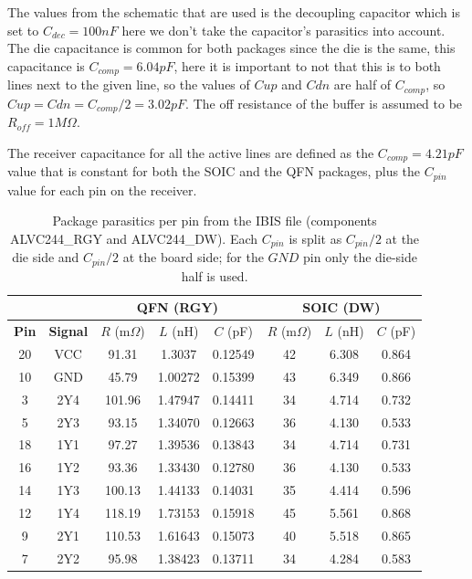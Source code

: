 The values from the schematic that are used is the decoupling capacitor which is set to $C_{dec}=100nF$ here we don't take the capacitor's parasitics into account. The die capacitance is common for both packages since the die is the same, this capacitance is $C_{comp}=6.04pF$, here it is important to not that this is to both lines next to the given line, so the values of $Cup$ and $Cdn$ are half of $C_{comp}$, so $Cup=Cdn=C_{comp}/2=3.02pF$. The off resistance of the buffer is assumed to be $R_{off}=1M\Omega$.

The receiver capacitance for all the active lines are defined as the $C_{comp}=4.21pF$ value that is constant for both the SOIC and the QFN packages, plus the $C_{pin}$ value for each pin on the receiver.

 
\begin{table}[htbp]
    \centering
    \begin{tabular}{|c|c|c|c|c|c|c|c|}
        \hline
        & & \multicolumn{3}{c|}{\textbf{QFN (RGY)}} & \multicolumn{3}{c|}{\textbf{SOIC (DW)}} \\
        \hline
        \textbf{Pin} & \textbf{Signal} & $R$ (m$\Omega$) & $L$ (nH) & $C$ (pF) & $R$ (m$\Omega$) & $L$ (nH) & $C$ (pF) \\
        \hline
        20 & VCC & 91.31 & 1.3037 & 0.12549 & 42 & 6.308 & 0.864 \\
        10 & GND & 45.79 & 1.00272 & 0.15399 & 43 & 6.349 & 0.866 \\
        3 & 2Y4 & 101.96 & 1.47947 & 0.14411 & 34 & 4.714 & 0.732 \\
        5 & 2Y3 & 93.15 & 1.34070 & 0.12663 & 36 & 4.130 & 0.533 \\
        18 & 1Y1 & 97.27 & 1.39536 & 0.13843 & 34 & 4.714 & 0.731 \\
        16 & 1Y2 & 93.36 & 1.33430 & 0.12780 & 36 & 4.130 & 0.533 \\
        14 & 1Y3 & 100.13 & 1.44133 & 0.14031 & 35 & 4.414 & 0.596 \\
        12 & 1Y4 & 118.19 & 1.73153 & 0.15918 & 45 & 5.561 & 0.868 \\
        9 & 2Y1 & 110.53 & 1.61643 & 0.15073 & 40 & 5.518 & 0.865 \\
        7 & 2Y2 & 95.98 & 1.38423 & 0.13711 & 34 & 4.284 & 0.583 \\
        \hline
    \end{tabular}
    \caption{Package parasitics per pin from the IBIS file (components ALVC244\_RGY and ALVC244\_DW). Each $C_{pin}$ is split as $C_{pin}/2$ at the die side and $C_{pin}/2$ at the board side; for the $GND$ pin only the die-side half is used.}
    \label{tab:sim_package}
\end{table}




